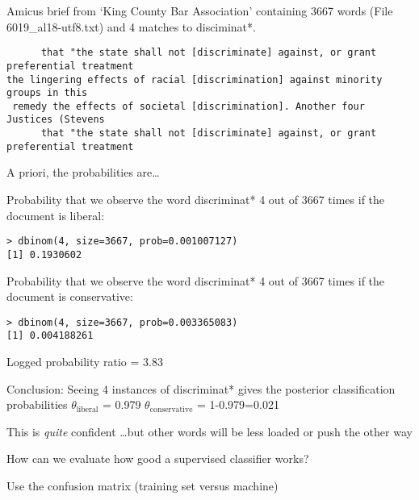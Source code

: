 \documentclass{mediumfoils}
\begin{document}

Amicus brief from `King County Bar Association' containing 3667 words (File 6019\_al18-utf8.txt) and 4 matches to disciminat*.

{\footnotesize
\begin{verbatim}
      that "the state shall not [discriminate] against, or grant preferential treatment
the lingering effects of racial [discrimination] against minority groups in this
 remedy the effects of societal [discrimination]. Another four Justices (Stevens
      that "the state shall not [discriminate] against, or grant preferential treatment
\end{verbatim}
}

A priori, the probabilities are\ldots

Probability that we observe the word  discriminat* 4 out of 3667 times if the document is liberal: 
{\small
\begin{verbatim}
> dbinom(4, size=3667, prob=0.001007127)
[1] 0.1930602
\end{verbatim}
}

Probability that we observe the word  discriminat* 4 out of 3667 times if the document is conservative:
{\small
\begin{verbatim}
> dbinom(4, size=3667, prob=0.003365083)
[1] 0.004188261
\end{verbatim}
}

Logged probability ratio = 3.83

\newpage


Conclusion: Seeing 4 instances of discriminat* gives the posterior classification probabilities
\ita
\itm $\theta_\text{liberal}$ = 0.979
\itm $\theta_\text{conservative}$ =  1-0.979=0.021
\itz

This is \textit{quite} confident
\ita
\itm \ldots but other words will be less loaded or push the other way
\itz






How can we evaluate how good a supervised classifier works? 

Use the confusion matrix (training set versus machine)


\end{document}

